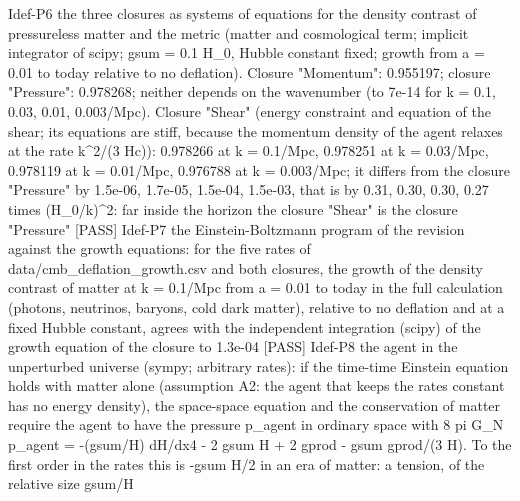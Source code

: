 \documentclass[
  10pt,
]{article}
\newenvironment{Shaded}{}{}
\newcommand{\NormalTok}[1]{#1}
\begin{document}
\begin{Shaded}
\begin{Highlighting}[]
\NormalTok{[PASS] Idef{-}P6  the three closures as systems of equations for the density contrast of pressureless matter and the metric (matter and cosmological term; implicit integrator of scipy; gsum = 0.1 H\_0, Hubble constant fixed; growth from a = 0.01 to today relative to no deflation). Closure "Momentum": 0.955197; closure "Pressure": 0.978268; neither depends on the wavenumber (to 7e{-}14 for k = 0.1, 0.03, 0.01, 0.003/Mpc). Closure "Shear" (energy constraint and equation of the shear; its equations are stiff, because the momentum density of the agent relaxes at the rate k\^{}2/(3 Hc)): 0.978266 at k = 0.1/Mpc, 0.978251 at k = 0.03/Mpc, 0.978119 at k = 0.01/Mpc, 0.976788 at k = 0.003/Mpc; it differs from the closure "Pressure" by 1.5e{-}06, 1.7e{-}05, 1.5e{-}04, 1.5e{-}03, that is by 0.31, 0.30, 0.30, 0.27 times (H\_0/k)\^{}2: far inside the horizon the closure "Shear" is the closure "Pressure"}
\NormalTok{[PASS] Idef{-}P7  the Einstein{-}Boltzmann program of the revision against the growth equations: for the five rates of data/cmb\_deflation\_growth.csv and both closures, the growth of the density contrast of matter at k = 0.1/Mpc from a = 0.01 to today in the full calculation (photons, neutrinos, baryons, cold dark matter), relative to no deflation and at a fixed Hubble constant, agrees with the independent integration (scipy) of the growth equation of the closure to 1.3e{-}04}
\NormalTok{[PASS] Idef{-}P8  the agent in the unperturbed universe (sympy; arbitrary rates): if the time{-}time Einstein equation holds with matter alone (assumption A2: the agent that keeps the rates constant has no energy density), the space{-}space equation and the conservation of matter require the agent to have the pressure p\_agent in ordinary space with 8 pi G\_N p\_agent = {-}(gsum/H) dH/dx4 {-} 2 gsum H + 2 gprod {-} gsum gprod/(3 H). To the first order in the rates this is {-}gsum H/2 in an era of matter: a tension, of the relative size gsum/H}
\end{Highlighting}
\end{Shaded}
\end{document}
